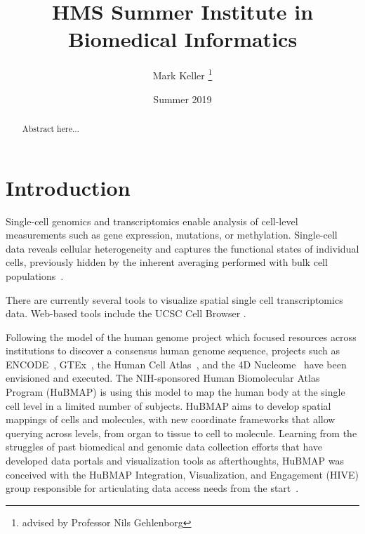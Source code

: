 \documentclass[12pt, letterpaper]{article}
\title{HMS Summer Institute in Biomedical Informatics}
\author{Mark Keller \thanks{advised by Professor Nils Gehlenborg}}
\date{Summer 2019}
\begin{document}
\maketitle

\begin{abstract}
Abstract here...
\end{abstract}

\section{Introduction}
Single-cell genomics and transcriptomics enable analysis of cell-level measurements such as gene expression, mutations, or methylation.
Single-cell data reveals cellular heterogeneity and captures the functional states of individual cells, previously hidden by the inherent averaging performed with bulk cell populations~\cite{shapiro2013single}.



There are currently several tools to visualize spatial single cell transcriptomics data. 
Web-based tools include the UCSC Cell Browser \cite{nowakowski2017spatiotemporal}.


Following the model of the human genome project which focused resources across institutions to discover a consensus human genome sequence, projects such as ENCODE~\cite{encode2004encode}, GTEx~\cite{lonsdale2013genotype}, the Human Cell Atlas~\cite{regev2017science}, and the 4D Nucleome~\cite{dekker20174d} have been envisioned and executed.
The NIH-sponsored Human Biomolecular Atlas Program (HuBMAP) is using this model to map the human body at the single cell level in a limited number of subjects.
HuBMAP aims to develop spatial mappings of cells and molecules, with new coordinate frameworks that allow querying across levels, from organ to tissue to cell to molecule.
Learning from the struggles of past biomedical and genomic data collection efforts that have developed data portals and visualization tools as afterthoughts, HuBMAP was conceived with the HuBMAP Integration, Visualization, and Engagement (HIVE) group responsible for articulating data access needs from the start~\cite{snyder2019mapping}.

\end{document}
